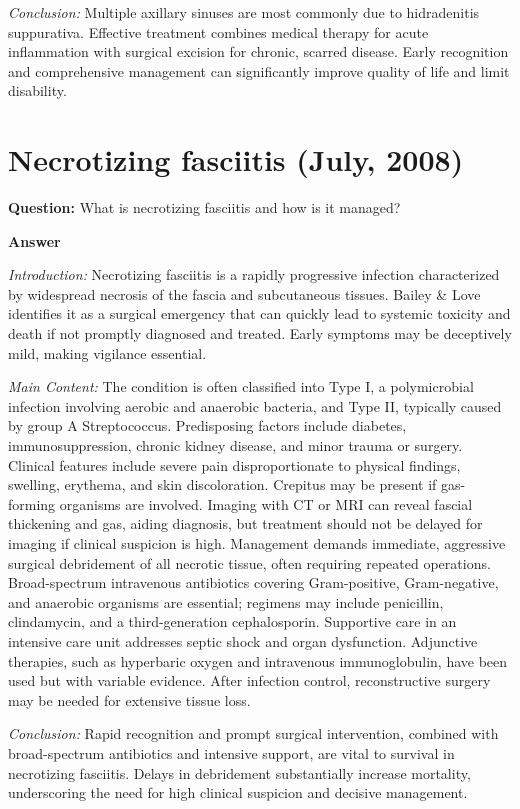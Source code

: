 \documentclass{article}
\begin{document}
\emph{Conclusion:} Multiple axillary sinuses are most commonly due to hidradenitis suppurativa. Effective treatment combines medical therapy for acute inflammation with surgical excision for chronic, scarred disease. Early recognition and comprehensive management can significantly improve quality of life and limit disability.


\section{Necrotizing fasciitis (July, 2008)}


\textbf{Question:} What is necrotizing fasciitis and how is it managed?

\textbf{Answer}

\emph{Introduction:} Necrotizing fasciitis is a rapidly progressive infection characterized by widespread necrosis of the fascia and subcutaneous tissues. Bailey \& Love identifies it as a surgical emergency that can quickly lead to systemic toxicity and death if not promptly diagnosed and treated. Early symptoms may be deceptively mild, making vigilance essential.

\emph{Main Content:} The condition is often classified into Type I, a polymicrobial infection involving aerobic and anaerobic bacteria, and Type II, typically caused by group A Streptococcus. Predisposing factors include diabetes, immunosuppression, chronic kidney disease, and minor trauma or surgery. Clinical features include severe pain disproportionate to physical findings, swelling, erythema, and skin discoloration. Crepitus may be present if gas-forming organisms are involved. Imaging with CT or MRI can reveal fascial thickening and gas, aiding diagnosis, but treatment should not be delayed for imaging if clinical suspicion is high. Management demands immediate, aggressive surgical debridement of all necrotic tissue, often requiring repeated operations. Broad-spectrum intravenous antibiotics covering Gram-positive, Gram-negative, and anaerobic organisms are essential; regimens may include penicillin, clindamycin, and a third-generation cephalosporin. Supportive care in an intensive care unit addresses septic shock and organ dysfunction. Adjunctive therapies, such as hyperbaric oxygen and intravenous immunoglobulin, have been used but with variable evidence. After infection control, reconstructive surgery may be needed for extensive tissue loss.

\emph{Conclusion:} Rapid recognition and prompt surgical intervention, combined with broad-spectrum antibiotics and intensive support, are vital to survival in necrotizing fasciitis. Delays in debridement substantially increase mortality, underscoring the need for high clinical suspicion and decisive management.
\end{document}

